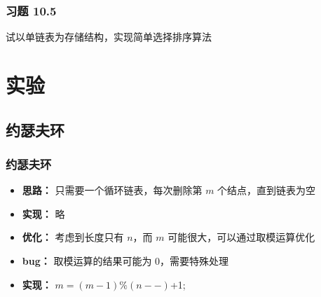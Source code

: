 \documentclass{beamer}
\begin{document}
    \begin{frame}
        \frametitle{习题 10.5}
        \begin{algorithm}[H]
            \caption{试以单链表为存储结构，实现简单选择排序算法}
        \end{algorithm}
    \end{frame}

    \section{实验}

    \subsection{约瑟夫环}
    \begin{frame}
        \frametitle{约瑟夫环}
        \begin{itemize}
            \item<1-> \textbf{思路：} 只需要一个循环链表，每次删除第 $m$ 个结点，直到链表为空
            \item<2-> \textbf{实现：} 略
            \item<3-> \textbf{优化：} 考虑到长度只有 $n$，而 $m$ 可能很大，可以通过取模运算优化
            \item<4-> \textbf{bug：} 取模运算的结果可能为 $0$，需要特殊处理
            \item<5-> \textbf{实现：} $m = (m-1)\%(n--)$+1;
        \end{itemize}
    \end{frame}
\end{document}
